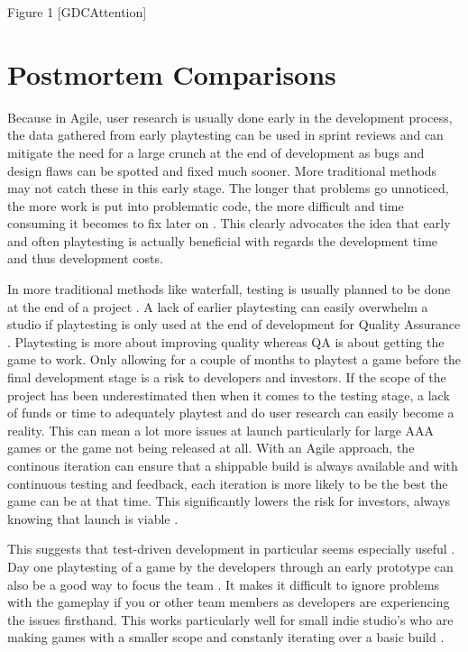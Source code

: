 \documentclass{scrartcl}
\begin{document}
\begin{center}
Figure 1 [GDCAttention]
\end{center}

\section{Postmortem Comparisons}

Because in Agile, user research is usually done early in the development process, the data gathered from early playtesting can be used in sprint reviews and can mitigate the need for a large crunch at the end of development as bugs and design flaws can be spotted and fixed much sooner\cite{PMKOA,}. More traditional methods may not catch these in this early stage. The longer that problems go unnoticed, the more work is put into problematic code, the more difficult and time consuming it becomes to fix later on \cite{GDCOTC,}. This clearly advocates the idea that early and often playtesting is actually beneficial with regards the development time and thus development costs. \par
In more traditional methods like waterfall, testing is usually planned to be done at the end of a project \cite{ji2011comparing,}. A lack of earlier playtesting can easily overwhelm a studio if playtesting is only used at the end of development for Quality Assurance \cite{PMTrine,}. Playtesting is more about improving quality whereas QA is about getting the game to work. Only allowing for a couple of months to playtest a game before the final development stage is a risk to developers and investors. If the scope of the project has been underestimated then when it comes to the testing stage, a lack of funds or time to adequately playtest and do user research can easily become a reality\cite{PMZZ,}. This can mean a lot more issues at launch particularly for large AAA games \cite{BrokenGames,} or the game not being released at all. With an Agile approach, the continous iteration can ensure that a shippable build is always available and with continuous testing and feedback, each iteration is more likely to be the best the game can be at that time. This significantly lowers the risk for investors, always knowing that launch is viable \cite{ghane2017quantitative,}. \par
This suggests that test-driven development in particular seems especially useful \cite{cunningham2005costs,}.
Day one playtesting of a game by the developers through an early prototype can also be a good way to focus the team \cite{Yampolsky:2016:LGD:2896958.2896965,}. It makes it difficult to ignore problems with the gameplay if you or other team members as developers are experiencing the issues firsthand. This works particularly well for small indie studio's who are making games with a smaller scope and constanly iterating over a basic build \cite{PMNS2,}.
\end{document}
